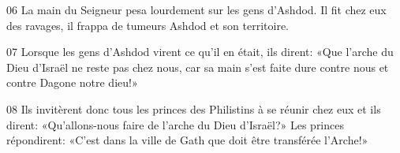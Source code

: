 
06 La main du Seigneur pesa lourdement sur les gens d’Ashdod. Il fit chez eux des ravages, il frappa de tumeurs Ashdod et son territoire.

07 Lorsque les gens d’Ashdod virent ce qu’il en était, ils dirent: «Que l’arche du Dieu d’Israël ne reste pas chez nous, car sa main s’est faite dure contre nous et contre Dagone notre dieu!»

08 Ils invitèrent donc tous les princes des Philistins à se réunir chez eux et ils dirent: «Qu’allons-nous faire de l’arche du Dieu d’Israël?» Les princes répondirent: «C’est dans la ville de Gath que doit être transférée l’Arche!» 